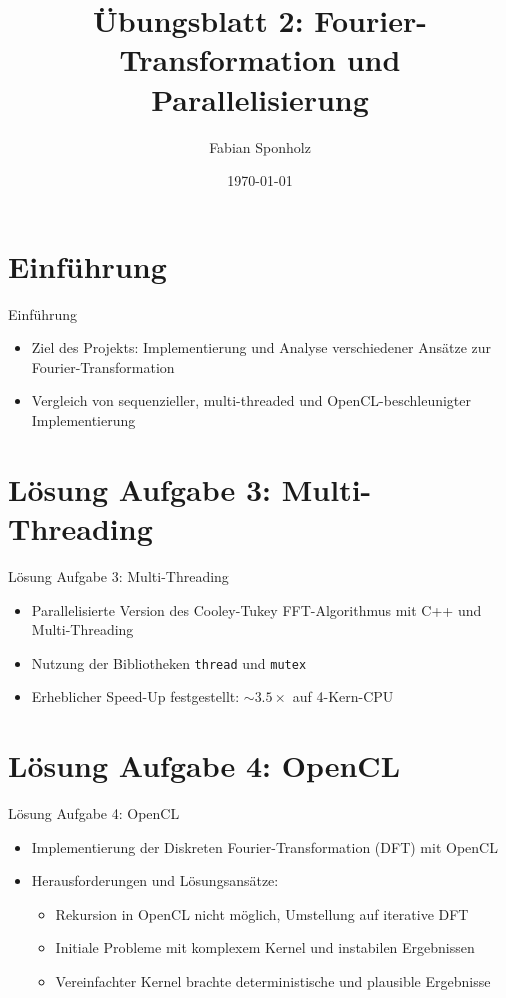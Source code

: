 \documentclass{beamer}
\title{Übungsblatt 2: Fourier-Transformation und Parallelisierung}
\author{Fabian Sponholz}
\date{\today}
\begin{document}
\frame{\titlepage}

\section{Einführung}
\begin{frame}{Einführung}
    \begin{itemize}
        \item Ziel des Projekts: Implementierung und Analyse verschiedener Ansätze zur Fourier-Transformation
        \item Vergleich von sequenzieller, multi-threaded und OpenCL-beschleunigter Implementierung
    \end{itemize}
\end{frame}

\section{Lösung Aufgabe 3: Multi-Threading}
\begin{frame}{Lösung Aufgabe 3: Multi-Threading}
    \begin{itemize}
        \item Parallelisierte Version des Cooley-Tukey FFT-Algorithmus mit C++ und Multi-Threading
        \item Nutzung der Bibliotheken \texttt{thread} und \texttt{mutex}
        \item Erheblicher Speed-Up festgestellt: $\sim 3.5 \times$ auf 4-Kern-CPU
    \end{itemize}
\end{frame}

\section{Lösung Aufgabe 4: OpenCL}
\begin{frame}{Lösung Aufgabe 4: OpenCL}
    \begin{itemize}
        \item Implementierung der Diskreten Fourier-Transformation (DFT) mit OpenCL
        \item Herausforderungen und Lösungsansätze:
        \begin{itemize}
            \item Rekursion in OpenCL nicht möglich, Umstellung auf iterative DFT
            \item Initiale Probleme mit komplexem Kernel und instabilen Ergebnissen
            \item Vereinfachter Kernel brachte deterministische und plausible Ergebnisse
        \end{itemize}
    \end{itemize}
\end{frame}
\end{document}
